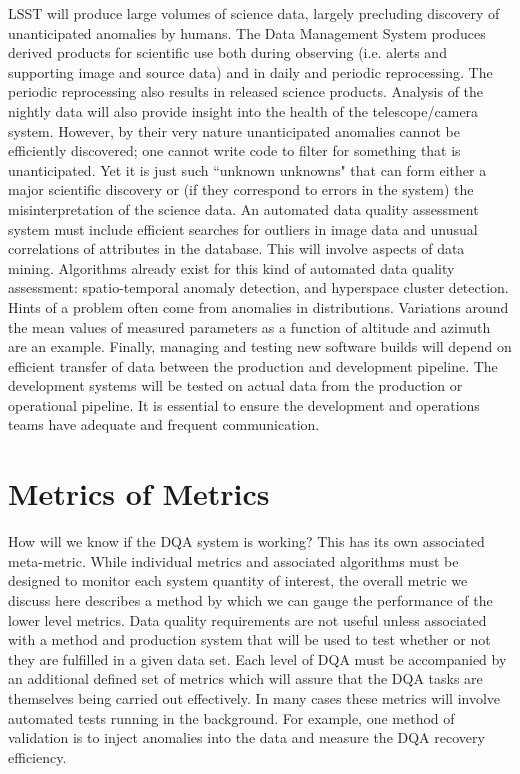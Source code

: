\documentclass[SE,toc,lsstdraft]{lsstdoc}
\begin{document}
LSST will produce large volumes of science data, largely precluding discovery of unanticipated anomalies by humans.  The Data Management System produces derived products for scientific use both during observing (i.e. alerts and supporting image and source data) and in daily and periodic reprocessing.  The periodic reprocessing also results in released science products. Analysis of the nightly data will also provide insight into the health of the telescope/camera system.  However, by their very nature unanticipated anomalies cannot be efficiently discovered; one cannot write code to filter for something that is unanticipated. Yet it is just such ``unknown unknowns" that can form either a major scientific discovery or (if they correspond to errors in the system) the misinterpretation of the science data.  An automated data quality assessment system must include efficient searches for outliers in image data and unusual correlations of attributes in the database. This will involve aspects of data mining.  Algorithms already exist for this kind of automated data quality assessment: spatio-temporal anomaly detection, and hyperspace cluster detection.
Hints of a problem often come from anomalies in distributions.  Variations around the mean values of measured parameters as a function of altitude and azimuth are an example.
Finally, managing and testing new software builds will depend on efficient transfer of data between the production and development pipeline. The development systems will be tested on actual data from the production or operational pipeline. It is essential to ensure the development and operations teams have adequate and frequent communication.

\section{Metrics of Metrics}

How will we know if the DQA system is working? This has its own associated meta-metric. While individual metrics and associated algorithms must be designed to monitor each system quantity of interest, the overall metric we discuss here describes a method by which we can gauge the performance of the lower level metrics.
Data quality requirements are not useful unless associated with a
method and production system that will be used to test whether or not they are fulfilled in
a given data set. Each level of DQA must be accompanied by an additional defined set of metrics which will assure that
the DQA tasks are themselves being carried out effectively. In many cases these metrics will involve
automated tests running in the background. For example, one method of validation is to inject anomalies into the data and measure the DQA recovery efficiency.
\end{document}
